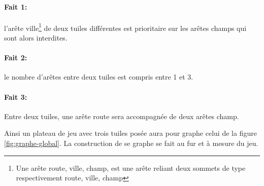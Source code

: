 \documentclass[a4paper, 11pt]{article}
\begin{document}
			\paragraph{Fait 1:}l'arête ville\footnote{Une arête route, ville, champ, est une arête reliant deux sommets de type respectivement route, ville, champ} de deux tuiles différentes est prioritaire sur les arêtes champs qui sont alors interdites.
			\paragraph{Fait 2:}le nombre d'arêtes entre deux tuiles est compris entre 1 et 3.
			\paragraph{Fait 3:}Entre deux tuiles, une arête route sera accompagnée de deux arêtes champ.

			 Ainsi un plateau de jeu avec trois tuiles posée aura pour graphe celui de la figure \ref{fig:graphe-global}. La construction de se graphe se fait au fur et à mesure du jeu.  \\
		    
\end{document}
